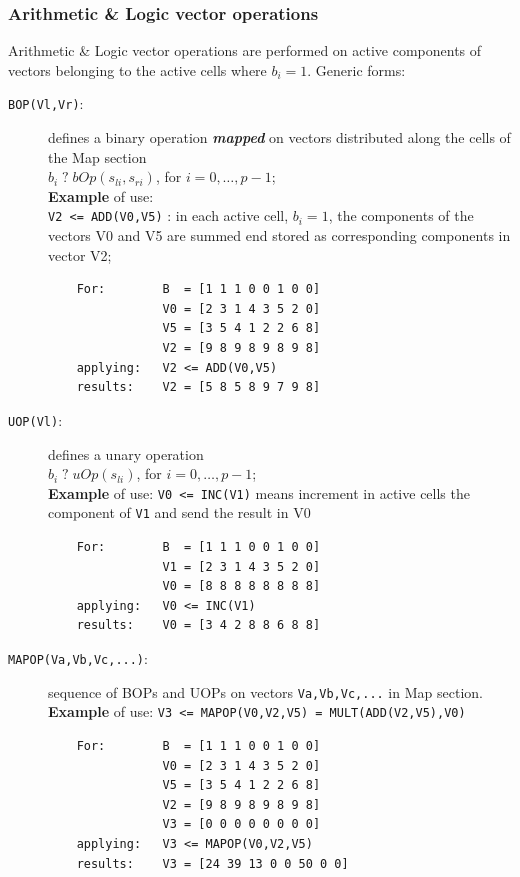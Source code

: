 \subsubsection{Arithmetic \& Logic vector operations}  

Arithmetic \& Logic vector operations are performed on active components of vectors belonging to the active cells where $b_i=1$. Generic forms:
\begin{description}
    \item[{\tt BOP(Vl,Vr)}:] defines a binary operation {\bf {\em mapped}} on vectors distributed along the cells of the Map section   \\ 
    $b_i \; ? \; bOp(s_{l i}, s_{r i})$, for $i = 0, \ldots, p-1$;\\
    {\bf Example} of use: \\ {\tt V2 <= ADD(V0,V5)} : in each active cell, $b_i=1$, the components of the vectors V0 and V5 are summed end stored as corresponding components in vector V2;
    \begin{verbatim}
    For:        B  = [1 1 1 0 0 1 0 0]
                V0 = [2 3 1 4 3 5 2 0]
                V5 = [3 5 4 1 2 2 6 8]
                V2 = [9 8 9 8 9 8 9 8]
    applying:   V2 <= ADD(V0,V5) 
    results:    V2 = [5 8 5 8 9 7 9 8]
    \end{verbatim}
    \item[{\tt UOP(Vl)}:] defines a unary operation  \\ 
    $b_i \; ? \; uOp(s_{l i})$, for $i = 0, \ldots, p-1$; \\
    {\bf Example} of use:  {\tt V0 <= INC(V1)} means increment in active cells the component of {\tt V1} and send the result in V0  
    \begin{verbatim}
    For:        B  = [1 1 1 0 0 1 0 0]
                V1 = [2 3 1 4 3 5 2 0]
                V0 = [8 8 8 8 8 8 8 8]
    applying:   V0 <= INC(V1) 
    results:    V0 = [3 4 2 8 8 6 8 8]
    \end{verbatim}
    \item[{\tt MAPOP(Va,Vb,Vc,...)}:] sequence of BOPs and UOPs on vectors {\tt Va,Vb,Vc,...} in Map section. \\
    {\bf Example} of use:  {\tt V3 <= MAPOP(V0,V2,V5) = MULT(ADD(V2,V5),V0)} 
    \begin{verbatim}
    For:        B  = [1 1 1 0 0 1 0 0]
                V0 = [2 3 1 4 3 5 2 0]
                V5 = [3 5 4 1 2 2 6 8]
                V2 = [9 8 9 8 9 8 9 8]
                V3 = [0 0 0 0 0 0 0 0]
    applying:   V3 <= MAPOP(V0,V2,V5) 
    results:    V3 = [24 39 13 0 0 50 0 0]
    \end{verbatim}
\end{description}

